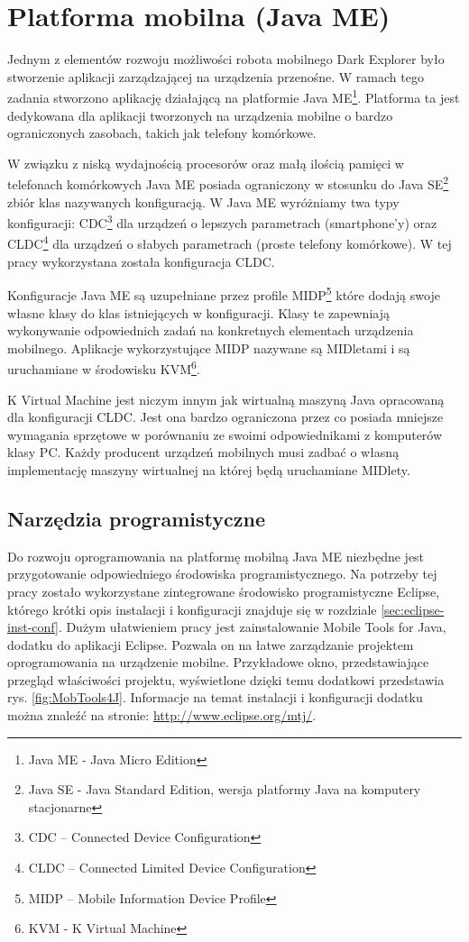 \section{Platforma mobilna (Java ME)}
\label{sec:javame-app}
Jednym z elementów rozwoju możliwości robota mobilnego Dark Explorer było
stworzenie aplikacji zarządzającej na urządzenia przenośne. W ramach tego zadania
stworzono aplikację działającą na platformie Java ME\footnote{Java ME - Java
Micro Edition}. Platforma ta jest dedykowana dla aplikacji tworzonych na
urządzenia mobilne o bardzo ograniczonych zasobach, takich jak telefony
komórkowe.

W związku z niską wydajnością procesorów oraz małą ilością pamięci w telefonach
komórkowych Java ME posiada ograniczony w stosunku do Java SE\footnote{Java SE -
Java Standard Edition, wersja platformy Java na komputery stacjonarne} zbiór klas
nazywanych konfiguracją. W Java ME wyróżniamy twa typy konfiguracji:
CDC\footnote{CDC -- Connected Device Configuration} dla urządzeń o lepszych
parametrach (smartphone'y) oraz CLDC\footnote{CLDC -- Connected Limited Device
Configuration} dla urządzeń o słabych parametrach (proste telefony komórkowe). W
tej pracy wykorzystana została konfiguracja CLDC.

Konfiguracje Java ME są uzupełniane przez profile MIDP\footnote{MIDP -- Mobile
Information Device Profile} które dodają swoje własne klasy do klas istniejących
w konfiguracji. Klasy te zapewniają wykonywanie odpowiednich zadań na konkretnych
elementach urządzenia mobilnego. Aplikacje wykorzystujące MIDP nazywane są
MIDletami i są uruchamiane w środowisku KVM\footnote{KVM - K Virtual Machine}.

K Virtual Machine jest niczym innym jak wirtualną maszyną Java opracowaną dla
konfiguracji CLDC. Jest ona bardzo ograniczona przez co posiada mniejsze
wymagania sprzętowe w porównaniu ze swoimi odpowiednikami z komputerów klasy PC.
Każdy producent urządzeń mobilnych musi zadbać o własną implementację maszyny
wirtualnej na której będą uruchamiane MIDlety.

\subsection{Narzędzia programistyczne}
Do rozwoju oprogramowania na platformę mobilną Java ME niezbędne jest przygotowanie odpowiedniego środowiska programistycznego. Na potrzeby tej pracy zostało wykorzystane zintegrowane środowisko programistyczne Eclipse, którego krótki opis instalacji i konfiguracji znajduje się w rozdziale \ref{sec:eclipse-inst-conf}. Dużym ułatwieniem pracy jest zainstalowanie Mobile Tools for Java, dodatku do aplikacji Eclipse. Pozwala on na łatwe zarządzanie projektem oprogramowania na urządzenie mobilne. Przykładowe okno, przedstawiające przegląd właściwości projektu, wyświetlone dzięki temu dodatkowi przedstawia rys. \ref{fig:MobTools4J}. Informacje na temat instalacji i konfiguracji dodatku można znaleźć na stronie: \url{http://www.eclipse.org/mtj/}.

